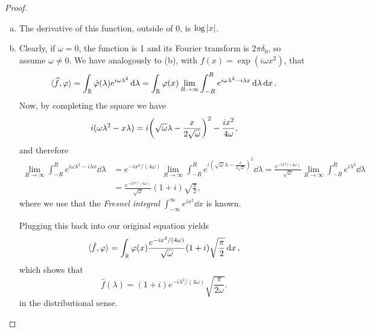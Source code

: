 \documentclass{article}
\theoremstyle{plain}
\theoremstyle{remark}
\renewcommand{\phi}{\varphi}
\newcommand{\Bb}{\mathbb}
\newcommand{\RR}{\Bb R}
\DeclarePairedDelimiter{\ang}{\langle}{\rangle}
\begin{document}
\begin{proof}
\begin{enumerate}[(a)]
	\item The derivative of this function, outside of 0, is $\log\abs{x}$. 
	
	\item  Clearly, if $\omega = 0$, the function is 1 and its Fourier transform is $2\pi\delta_0$, so assume $\omega \neq 0$. 
	We have analogously to (b), with $f(x) = \exp(i\omega x^2)$, that 
	\[
	\ang{\widehat{f}, \phi} = \int_\RR \hat\phi(\lambda) e^{i\omega \lambda^2} \dd{\lambda} = \int_\RR \phi(x) \lim_{R\to\infty} \int_{-R}^R e^{i\omega\lambda^2 - i\lambda x} \dd{\lambda} \dd{x}.
	\]
	Now, by completing the square we have
	\[
	i(\omega\lambda^2 - x\lambda) = i\qty(\sqrt\omega\lambda - \frac{x}{2\sqrt\omega})^2 - \frac{ix^2}{4\omega},
	\]
	and therefore
	\begin{align*}
	\lim_{R\to\infty} \int_{-R}^R e^{i\omega\lambda^2 - i\lambda x} \dd{\lambda} &= e^{-ix^2/(4\omega)} \lim_{R\to\infty} \int_{-R}^R e^{i(\sqrt\omega\lambda - \frac{x}{2\sqrt\omega})^2}\dd{\lambda} = \frac{e^{-ix^2/(4\omega)}}{\sqrt\omega} \lim_{R\to\infty} \int_{-R}^R e^{i\lambda^2} \dd{\lambda} \\
	&= \frac{e^{-ix^2/(4\omega)}}{\sqrt\omega} (1+i)\sqrt{\frac\pi2}, 
	\end{align*}
	where we use that the \emph{Fresnel integral} $\int_{-\infty}^\infty e^{ix^2} \dd{x}$ is known. 
	
	Plugging this back into our original equation yields
	\[
	\ang{\hat f, \phi} = \int_\RR \phi(x) \frac{e^{-ix^2/(4\omega)}}{\sqrt\omega} (1+i)\sqrt{\frac\pi2} \dd{x}, 
	\]
	which shows that
	\[
	\hat f(\lambda) =  (1+i) e^{-i\lambda^2/(4\omega)} \sqrt{\frac{\pi}{2\omega}}. 
	\]
	in the distributional sense. 
	\end{enumerate}
\end{proof}
\end{document}
